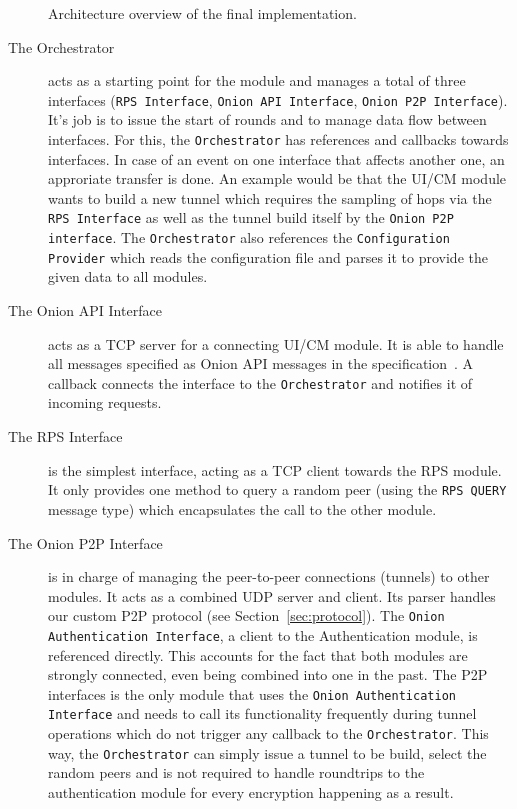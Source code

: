 \documentclass[paper=letter, fontsize=12pt]{article}
\begin{document}
\begin{figure}[ht]
{}
    \caption{Architecture overview of the final implementation.}
    \label{fig:architecture}
\end{figure}


\begin{description}
    \item [The Orchestrator] acts as a starting point for the module and manages a total of three interfaces (\texttt{RPS Interface}, \texttt{Onion API Interface}, \texttt{Onion P2P Interface}). It's job is to issue the start of rounds and to manage data flow between interfaces. For this, the \texttt{Orchestrator} has references and callbacks towards interfaces. In case of an event on one interface that affects another one, an approriate transfer is done. An example would be that the UI/CM module wants to build a new tunnel which requires the sampling of hops via the \texttt{RPS Interface} as well as the tunnel build itself by the \texttt{Onion P2P interface}. The \texttt{Orchestrator} also references the \texttt{Configuration Provider} which reads the configuration file and parses it to provide the given data to all modules.

    \item [The Onion API Interface] acts as a TCP server for a connecting UI/CM module. It is able to handle all messages specified as Onion API messages in the specification~\cite{spec}.
    A callback connects the interface to the \texttt{Orchestrator} and notifies it of incoming requests.

    \item [The RPS Interface] is the simplest interface, acting as a TCP client towards the RPS module. It only provides one method to query a random peer (using the \texttt{RPS QUERY} message type) which encapsulates the call to the other module.

    \item [The Onion P2P Interface] is in charge of managing the peer-to-peer connections (tunnels) to other modules. It acts as a combined UDP server and client. Its parser handles our custom P2P protocol (see Section~\ref{sec:protocol}). The \texttt{Onion Authentication Interface}, a client to the Authentication module, is referenced directly. This accounts for the fact that both modules are strongly connected, even being combined into one in the past. The P2P interfaces is the only module that uses the \texttt{Onion Authentication Interface} and needs to call its functionality frequently during tunnel operations which do not trigger any callback to the \texttt{Orchestrator}. This way, the \texttt{Orchestrator} can simply issue a tunnel to be build, select the random peers and is not required to handle roundtrips to the authentication module for every encryption happening as a result.


\end{description}
\end{document}
